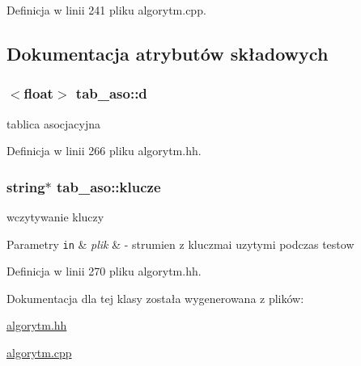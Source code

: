 \-Definicja w linii 241 pliku algorytm.\-cpp.



\subsection{\-Dokumentacja atrybutów składowych}
\hypertarget{classtab__aso_a5ee486c3f7635778bcb585cc655f5245}{
\subsubsection[{d}]{$<$float$>$ {\bf tab\-\_\-aso\-::d}}}\label{classtab__aso_a5ee486c3f7635778bcb585cc655f5245}


tablica asocjacyjna 



\-Definicja w linii 266 pliku algorytm.\-hh.

\hypertarget{classtab__aso_aa9d7d3471353afaa7585c6bbcd8e26a5}{
\subsubsection[{klucze}]{\setlength{\rightskip}{0pt plus 5cm}string$\ast$ {\bf tab\-\_\-aso\-::klucze}}}\label{classtab__aso_aa9d7d3471353afaa7585c6bbcd8e26a5}


wczytywanie kluczy 


\begin{DoxyParams}[1]{\-Parametry}
\mbox{\tt in}  & {\em plik} & -\/ strumien z kluczmai uzytymi podczas testow \\
\hline
\end{DoxyParams}


\-Definicja w linii 270 pliku algorytm.\-hh.



\-Dokumentacja dla tej klasy została wygenerowana z plików\-:\begin{DoxyCompactItemize}
\item 
\hyperlink{algorytm_8hh}{algorytm.\-hh}\item 
\hyperlink{algorytm_8cpp}{algorytm.\-cpp}\end{DoxyCompactItemize}
